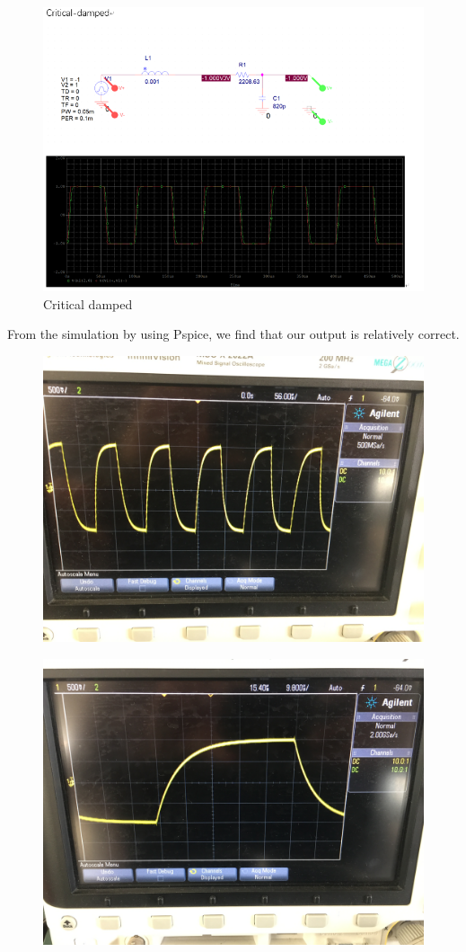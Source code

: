 \documentclass{article}
\begin{document}
\begin{figure}[H]
	\centering
	\includegraphics[width=0.7\linewidth]{p2}
	\caption{Critical damped}
	\label{fig:p2}
\end{figure}
From the simulation by using Pspice, we find that our output is relatively correct.
\begin{figure}[H]
	\centering
	\includegraphics[width=0.7\linewidth]{IMG_6449}
	\label{fig:img6449}
\end{figure}
\begin{figure}[H]
	\centering
	\includegraphics[width=0.7\linewidth]{IMG_6450}
	\label{fig:img6450}
\end{figure}
\end{document}
